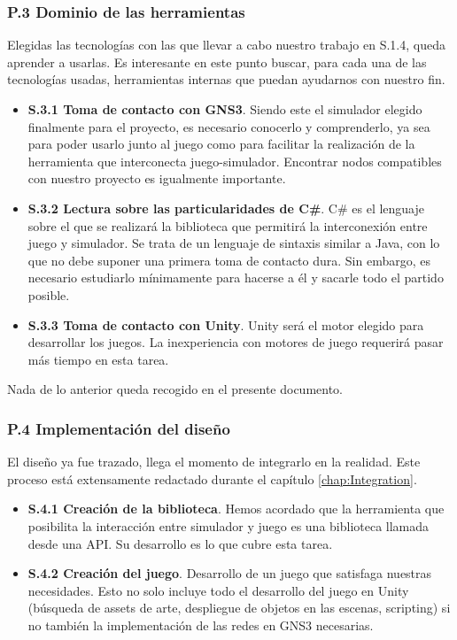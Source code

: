 \subsubsection{P.3 Dominio de las herramientas}
Elegidas las tecnologías con las que llevar a cabo nuestro trabajo en S.1.4, queda aprender a usarlas. Es interesante en este punto buscar, para cada una de las tecnologías usadas, herramientas internas que puedan ayudarnos con nuestro fin.
\begin{itemize}
\item \textbf{S.3.1 Toma de contacto con GNS3}. Siendo este el simulador elegido finalmente para el proyecto, es necesario conocerlo y comprenderlo, ya sea para poder usarlo junto al juego como para facilitar la realización de la herramienta que interconecta juego-simulador. Encontrar nodos compatibles con nuestro proyecto es igualmente importante.
\item \textbf{S.3.2 Lectura sobre las particularidades de C\#}. C\# es el lenguaje sobre el que se realizará la biblioteca que permitirá la interconexión entre juego y simulador. Se trata de un lenguaje de sintaxis similar a Java, con lo que no debe suponer una primera toma de contacto dura. Sin embargo, es necesario estudiarlo mínimamente para hacerse a él y sacarle todo el partido posible.
\item \textbf{S.3.3 Toma de contacto con Unity}. Unity será el motor elegido para desarrollar los juegos. La inexperiencia con motores de juego requerirá pasar más tiempo en esta tarea.
\end{itemize}

Nada de lo anterior queda recogido en el presente documento.

\subsubsection{P.4 Implementación del diseño}
El diseño ya fue trazado, llega el momento de integrarlo en la realidad. Este proceso está extensamente redactado durante el capítulo \ref{chap:Integration}.
\begin{itemize}
\item \textbf{S.4.1 Creación de la biblioteca}. Hemos acordado que la herramienta que posibilita la interacción entre simulador y juego es una biblioteca llamada desde una API. Su desarrollo es lo que cubre esta tarea. 
\item \textbf{S.4.2 Creación del juego}. Desarrollo de un juego que satisfaga nuestras necesidades. Esto no solo incluye todo el desarrollo del juego en Unity (búsqueda de assets de arte, despliegue de objetos en las escenas, scripting) si no también la implementación de las redes en GNS3 necesarias.
\end{itemize}

